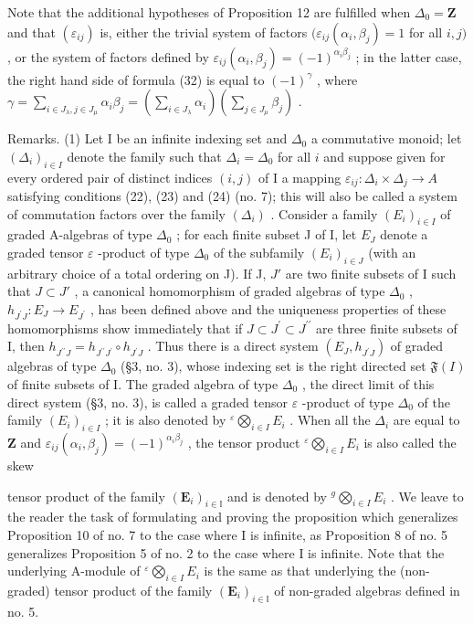 Note that the additional hypotheses of Proposition 12 are fulfilled when \(\Delta_0 = \mathbf{Z}\) and that \((\varepsilon_{ij})\) is, either the trivial system of factors \((\varepsilon_{ij}(\alpha_i,\beta_j) = 1\) for all \(i,j)\) , or the system of factors defined by \(\varepsilon_{ij}(\alpha_i,\beta_j) = (-1)^{\alpha_i\beta_j}\) ; in the latter case, the right hand side of formula (32) is equal to \((-1)^{\gamma}\) , where \(\gamma = \sum_{i\in J_{\lambda},j\in J_{\mu}}\alpha_{i}\beta_{j} = \left(\sum_{i\in J_{\lambda}}\alpha_{i}\right)\left(\sum_{j\in J_{\mu}}\beta_{j}\right)\) .

Remarks. (1) Let I be an infinite indexing set and \(\Delta_0\) a commutative monoid; let \((\Delta_i)_{i \in I}\) denote the family such that \(\Delta_i = \Delta_0\) for all \(i\) and suppose given for every ordered pair of distinct indices \((i,j)\) of I a mapping \(\varepsilon_{ij} : \Delta_i \times \Delta_j \to A\) satisfying conditions (22), (23) and (24) (no. 7); this will also be called a system of commutation factors over the family \((\Delta_i)\) . Consider a family \((E_i)_{i \in I}\) of graded A-algebras of type \(\Delta_0\) ; for each finite subset J of I, let \(E_J\) denote a graded tensor \(\varepsilon\) -product of type \(\Delta_0\) of the subfamily \((E_i)_{i \in J}\) (with an arbitrary choice of a total ordering on J). If J, \(J'\) are two finite subsets of I such that \(J \subset J'\) , a canonical homomorphism of graded algebras of type \(\Delta_0\) , \(h_{J^{\prime}J}:E_{J}\to E_{J^{\prime}}\) , has been defined above and the uniqueness properties of these homomorphisms show immediately that if \(J\subset J^{\prime}\subset J^{\prime\prime}\) are three finite subsets of I, then \(h_{J^{\prime\prime}J}=h_{J^{\prime\prime}J^{\prime}}\circ h_{J^{\prime}J}\) . Thus there is a direct system \((E_{J},h_{J^{\prime}J})\) of graded algebras of type \(\Delta_{0}\) (§3, no. 3), whose indexing set is the right directed set \(\mathfrak{F}(I)\) of finite subsets of I. The graded algebra of type \(\Delta_{0}\) , the direct limit of this direct system (§3, no. 3), is called a graded tensor \(\varepsilon\) -product of type \(\Delta_{0}\) of the family \((E_{i})_{i\in I}\) ; it is also denoted by \({}^{\varepsilon}\bigotimes_{i\in I}E_{i}\) . When all the \(\Delta_{i}\) are equal to \(\mathbf{Z}\) and \(\varepsilon_{ij}(\alpha_{i},\beta_{j})=(-1)^{\alpha_{i}\beta_{j}}\) , the tensor product \({}^{\varepsilon}\bigotimes_{i\in I}E_{i}\) is also called the skew

tensor product of the family \((\mathbf{E}_{i})_{i\in\mathbb{I}}\) and is denoted by \({}^{g}\bigotimes_{i\in I}E_{i}\) . We leave to the reader the task of formulating and proving the proposition which generalizes Proposition 10 of no. 7 to the case where I is infinite, as Proposition 8 of no. 5 generalizes Proposition 5 of no. 2 to the case where I is infinite. Note that the underlying A-module of \({}^{\varepsilon}\bigotimes_{i\in I}E_{i}\) is the same as that underlying the (non-graded) tensor product of the family \((\mathbf{E}_{i})_{i\in\mathbb{I}}\) of non-graded algebras defined in no. 5.

